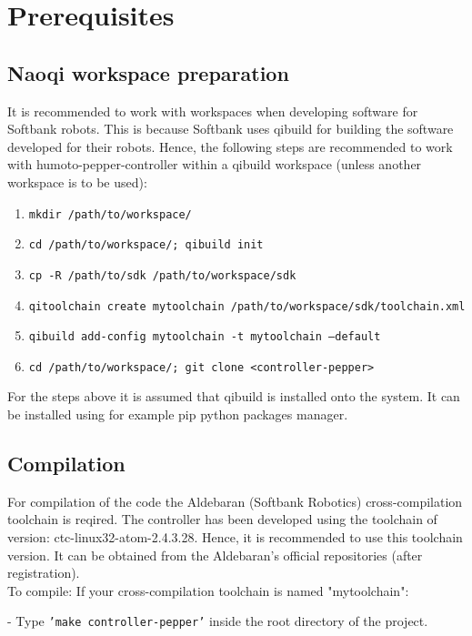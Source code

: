 \section{Prerequisites}

\subsection{Naoqi workspace preparation}
\noindent It is recommended to work with workspaces when developing software for Softbank robots. This is because
Softbank uses qibuild for building the software developed for their robots. Hence, the following steps are recommended
to work with humoto-pepper-controller within a qibuild workspace (unless another workspace is to be used):

\begin{enumerate}
\item \texttt{mkdir /path/to/workspace/}
\item \texttt{cd /path/to/workspace/; qibuild init}
\item \texttt{cp -R /path/to/sdk /path/to/workspace/sdk}
\item \texttt{qitoolchain create mytoolchain /path/to/workspace/sdk/toolchain.xml}
\item \texttt{qibuild add-config mytoolchain -t mytoolchain --default}
\item \texttt{cd /path/to/workspace/; git clone <controller-pepper>}
\end{enumerate}

\noindent For the steps above it is assumed that qibuild is installed onto the system. It can be installed using for example pip
python packages manager.

\subsection{Compilation}
\noindent For compilation of the code the Aldebaran (Softbank Robotics) cross-compilation toolchain is reqired. The
controller has been developed using the toolchain of version: ctc-linux32-atom-2.4.3.28. Hence, it is recommended to use
this toolchain version. It can be obtained from the Aldebaran's official repositories (after registration).\\

\noindent To compile:
\noindent If your cross-compilation toolchain is named "mytoolchain":

- Type \texttt{'make controller-pepper'} inside the root directory of the project.\\

